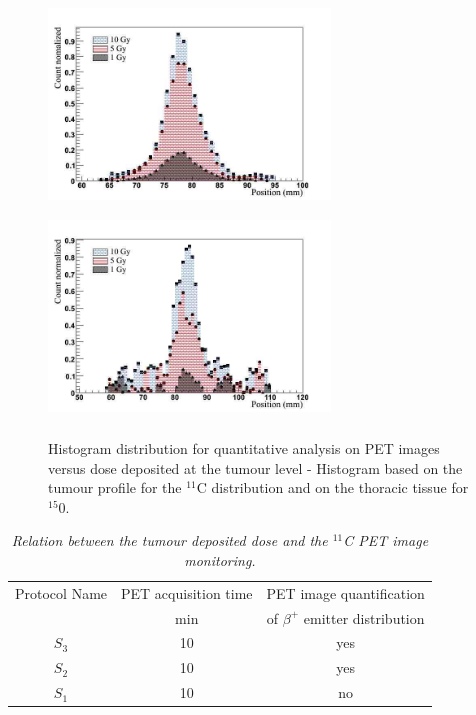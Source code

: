 \documentclass[11pt]{iopart}
\begin{document}
\begin{figure}[!htbp]
  \begin{center}
    \includegraphics[width=75mm,height=55mm]{figures/histo_lung_C11_paper.jpg}
    \includegraphics[width=75mm,height=55mm]{figures/histo_lung_O15_paper.jpg}
    \caption{Histogram distribution for quantitative analysis on PET
      images versus dose deposited at the tumour level - Histogram
      based on the tumour profile for the $^{11}$C distribution and on
      the thoracic tissue for $^{15}$0.}
  \end{center}
  \label{fig:fig4}
\end{figure}

\begin{table}[htbp]
\begin{center}
\begin{tabular}{|c|c|c|} \hline
 Protocol Name  & PET acquisition time  & PET image quantification       \\
                              &  min                  & of $\beta^{+}$ emitter distribution       \\ \hline \hline
 
$S_{3}$              & 10                    &  yes                           \\ \hline
$S_{2}$              & 10                    &  yes                           \\ \hline
$S_{1}$              & 10                    &  no                            \\ \hline \hline 

\end{tabular}
\end{center} 
\caption{\it Relation between the tumour deposited dose and the $^{11}$C PET image monitoring.}
\label{tab:results}
\end{table}
\end{document}
